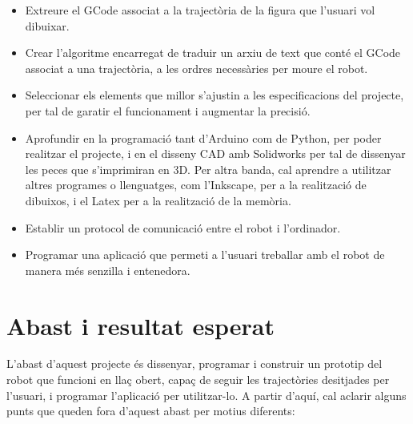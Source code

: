 \begin{itemize}
	\item Extreure el GCode associat a la trajectòria de la figura que l'usuari vol dibuixar.
	
	\item Crear l'algoritme encarregat de traduir un arxiu de text que conté el GCode associat a una trajectòria, a les ordres necessàries per moure el robot.
	
	\item Seleccionar els elements que millor s'ajustin a les especificacions del projecte, per tal de garatir el funcionament i augmentar la precisió.
	
	\item Aprofundir en la programació tant d'Arduino com de Python, per poder realitzar el projecte, i en el disseny CAD amb Solidworks per tal de dissenyar les peces que s'imprimiran en 3D. Per altra banda, cal aprendre a utilitzar altres programes o llenguatges, com l'Inkscape, per a la realització de dibuixos, i el Latex per a la realització de la memòria.
	
	\item Establir un protocol de comunicació entre el robot i l'ordinador.
	
	\item Programar una aplicació que permeti a l'usuari treballar amb el robot de manera més senzilla i entenedora.
\end{itemize} 



\section{Abast i resultat esperat}

L'abast d'aquest projecte és dissenyar, programar i construir un prototip del robot que funcioni en llaç obert, capaç de seguir les trajectòries desitjades per l'usuari, i programar l'aplicació per utilitzar-lo. A partir d'aquí, cal aclarir alguns punts que queden fora d'aquest abast per motius diferents:

